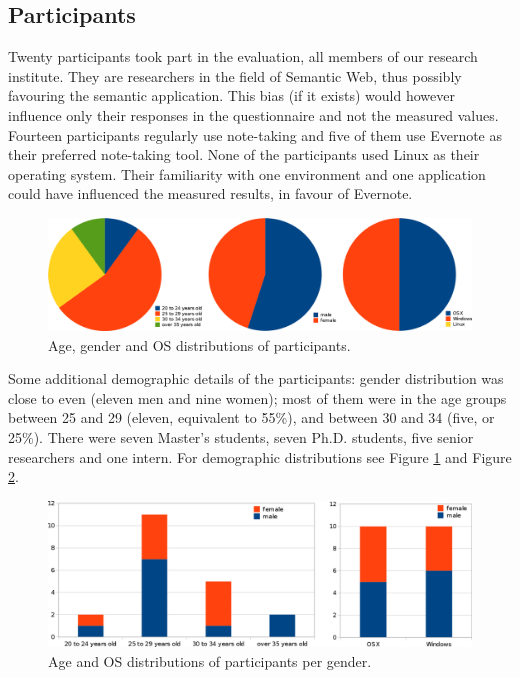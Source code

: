 \subsection{Participants} 

Twenty participants took part in the evaluation, all members of our research institute. They are researchers in the field of Semantic Web, thus possibly favouring the semantic application. This bias (if it exists) would however influence only their responses in the questionnaire and not the measured values. Fourteen participants regularly use note-taking and five of them use Evernote as their preferred note-taking tool. None of the participants used Linux as their operating system. Their familiarity with one environment and one application could have influenced the measured results, in favour of Evernote.

\begin{figure}[htb]
 \includegraphics[width=0.95\linewidth]{chapters/core/img/distribs}
\caption{Age, gender and OS distributions of participants.}
\label{fig:distribs}
\end{figure}

Some additional demographic details of the participants: gender distribution was close to even (eleven men and nine women); most of them were in the age groups between 25 and 29 (eleven, equivalent to 55\%), and between 30 and 34 (five, or 25\%). There were seven Master's students, seven Ph.D. students, five senior researchers and one intern. For demographic distributions see Figure \ref{fig:distribs} and Figure \ref{fig:genderdistribs}.

\begin{figure}[htb]
 \includegraphics[width=0.9\linewidth]{chapters/core/img/genderdistribs}
\caption{Age and OS distributions of participants per gender.}
\label{fig:genderdistribs}
\end{figure}

